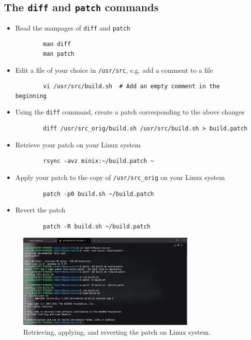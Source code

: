 \documentclass[a4paper]{article}
\begin{document}
\subsection{The \texttt{diff} and \texttt{patch} commands}
\begin{itemize}
    \item Read the manpages of \texttt{diff} and \texttt{patch}
    \begin{verbatim}
        man diff
        man patch
    \end{verbatim}
    \item Edit a file of your choice in \texttt{/usr/src}, e.g. add a comment to a file
    \begin{verbatim}
        vi /usr/src/build.sh  # Add an empty comment in the beginning
    \end{verbatim}
    \item Using the \texttt{diff} command, create a patch corresponding to the above changes
    \begin{verbatim}
        diff /usr/src_orig/build.sh /usr/src/build.sh > build.patch
    \end{verbatim}
    \item Retrieve your patch on your Linux system
    \begin{verbatim}
        rsync -avz minix:~/build.patch ~
    \end{verbatim}
    \item Apply your patch to the copy of \texttt{/usr/src\_orig} on your Linux system
    \begin{verbatim}
        patch -p0 build.sh ~/build.patch
    \end{verbatim}
    \item Revert the patch
    \begin{verbatim}
        patch -R build.sh ~/build.patch
    \end{verbatim}
\end{itemize}
\begin{figure}[H]
    \centering
    \includegraphics[width=0.8\textwidth]{3.png}
    \caption{Retrieving, applying, and reverting the patch on Linux system.}
\end{figure}
\end{document}
